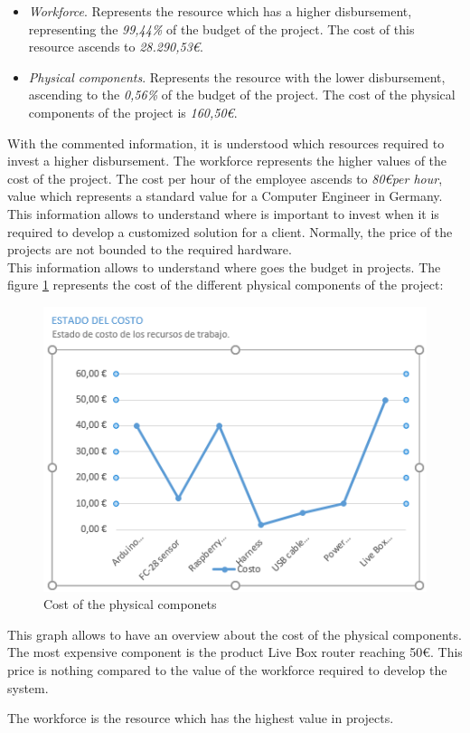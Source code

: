 \begin{itemize}

\item \textit{Workforce}. Represents the resource which has a higher disbursement, representing the \textit{99,44\%} of the budget of the project. The cost of this resource ascends to \textit{28.290,53\euro}.

\item \textit{Physical components}. Represents the resource with the lower disbursement, ascending to the \textit{0,56\%} of the budget of the project. The cost of the physical components of the project is \textit{160,50\euro}.

\end{itemize}

With the commented information, it is understood which resources required to invest a higher disbursement. The workforce represents the higher values of the cost of the project. The cost per hour of the employee ascends to \textit{80\euro per hour}, value which represents a standard value for a Computer Engineer in Germany. This information allows to understand where is important to invest when it is required to develop a customized solution for a client. Normally, the price of the projects are not bounded to the required hardware.\\

This information allows to understand where goes the budget in projects. The figure \ref{Cost of the physical componets} represents the cost of the different physical components of the project:

\begin{figure}[H]
\begin{centering}
\includegraphics[scale=1]{IMGS/cost_materials.PNG}
\caption{Cost of the physical componets \label{Cost of the physical componets}}
\end{centering}
\end{figure}

This graph allows to have an overview about the cost of the physical components. The most expensive component is the product Live Box router reaching 50\euro. This price is nothing compared to the value of the workforce required to develop the system.

The workforce is the resource which has the highest value in projects.

\newpage
\newpage